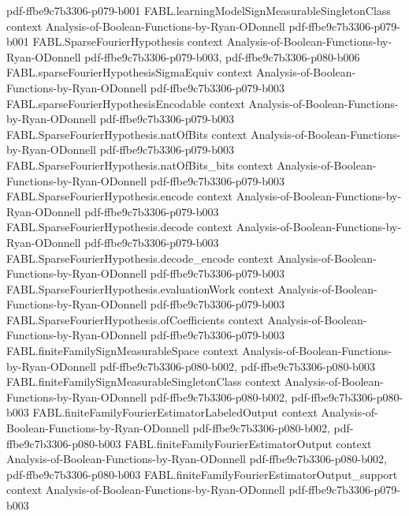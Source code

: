 \begin{theorem}
  {pdf-ffbe9c7b3306-p079-b001}
\proofstep
  {FABL.learningModelSignMeasurableSingletonClass}
  {context}
  {Analysis-of-Boolean-Functions-by-Ryan-ODonnell}
  {pdf-ffbe9c7b3306-p079-b001}
\proofstep
  {FABL.SparseFourierHypothesis}
  {context}
  {Analysis-of-Boolean-Functions-by-Ryan-ODonnell}
  {pdf-ffbe9c7b3306-p079-b003,
    pdf-ffbe9c7b3306-p080-b006}
\proofstep
  {FABL.sparseFourierHypothesisSigmaEquiv}
  {context}
  {Analysis-of-Boolean-Functions-by-Ryan-ODonnell}
  {pdf-ffbe9c7b3306-p079-b003}
\proofstep
  {FABL.sparseFourierHypothesisEncodable}
  {context}
  {Analysis-of-Boolean-Functions-by-Ryan-ODonnell}
  {pdf-ffbe9c7b3306-p079-b003}
\proofstep
  {FABL.SparseFourierHypothesis.natOfBits}
  {context}
  {Analysis-of-Boolean-Functions-by-Ryan-ODonnell}
  {pdf-ffbe9c7b3306-p079-b003}
\proofstep
  {FABL.SparseFourierHypothesis.natOfBits_bits}
  {context}
  {Analysis-of-Boolean-Functions-by-Ryan-ODonnell}
  {pdf-ffbe9c7b3306-p079-b003}
\proofstep
  {FABL.SparseFourierHypothesis.encode}
  {context}
  {Analysis-of-Boolean-Functions-by-Ryan-ODonnell}
  {pdf-ffbe9c7b3306-p079-b003}
\proofstep
  {FABL.SparseFourierHypothesis.decode}
  {context}
  {Analysis-of-Boolean-Functions-by-Ryan-ODonnell}
  {pdf-ffbe9c7b3306-p079-b003}
\proofstep
  {FABL.SparseFourierHypothesis.decode_encode}
  {context}
  {Analysis-of-Boolean-Functions-by-Ryan-ODonnell}
  {pdf-ffbe9c7b3306-p079-b003}
\proofstep
  {FABL.SparseFourierHypothesis.evaluationWork}
  {context}
  {Analysis-of-Boolean-Functions-by-Ryan-ODonnell}
  {pdf-ffbe9c7b3306-p079-b003}
\proofstep
  {FABL.SparseFourierHypothesis.ofCoefficients}
  {context}
  {Analysis-of-Boolean-Functions-by-Ryan-ODonnell}
  {pdf-ffbe9c7b3306-p079-b003}
\proofstep
  {FABL.finiteFamilySignMeasurableSpace}
  {context}
  {Analysis-of-Boolean-Functions-by-Ryan-ODonnell}
  {pdf-ffbe9c7b3306-p080-b002,
    pdf-ffbe9c7b3306-p080-b003}
\proofstep
  {FABL.finiteFamilySignMeasurableSingletonClass}
  {context}
  {Analysis-of-Boolean-Functions-by-Ryan-ODonnell}
  {pdf-ffbe9c7b3306-p080-b002,
    pdf-ffbe9c7b3306-p080-b003}
\proofstep
  {FABL.finiteFamilyFourierEstimatorLabeledOutput}
  {context}
  {Analysis-of-Boolean-Functions-by-Ryan-ODonnell}
  {pdf-ffbe9c7b3306-p080-b002,
    pdf-ffbe9c7b3306-p080-b003}
\proofstep
  {FABL.finiteFamilyFourierEstimatorOutput}
  {context}
  {Analysis-of-Boolean-Functions-by-Ryan-ODonnell}
  {pdf-ffbe9c7b3306-p080-b002,
    pdf-ffbe9c7b3306-p080-b003}
\proofstep
  {FABL.finiteFamilyFourierEstimatorOutput_support}
  {context}
  {Analysis-of-Boolean-Functions-by-Ryan-ODonnell}
  {pdf-ffbe9c7b3306-p079-b003}
\proofstep

\end{theorem}
